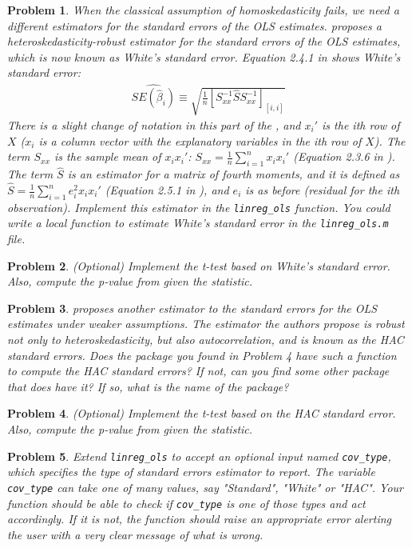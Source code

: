 \documentclass[12pt, a4paper]{article}
\newtheorem{problem}{Problem}
\begin{document}
\begin{problem}
When the classical assumption of homoskedasticity fails, we need a different estimators for the standard errors of the OLS estimates.
\citet{W1980} proposes a heteroskedasticity-robust estimator for the standard errors of the OLS estimates, which is now known as White's standard error.
Equation 2.4.1 in \citet{H2000} shows White's standard error:
\begin{align*}
\widehat{SE(\hat{\beta}_i)}\equiv\sqrt{\frac{1}{n}[S_{xx}^{-1}\hat{S}S_{xx}^{-1}]_{[i,i]}}
\end{align*}
There is a slight change of notation in this part of the \citet{H2000}, and \(x_i'\) is the ith row of \(X\) (\(x_i\) is a column vector with the explanatory variables in the ith row of \(X\)).
The term \(S_{xx}\) is the sample mean of \(x_ix_i'\): \(S_{xx}=\frac{1}{n}\sum_{i=1}^nx_ix_i'\) (Equation 2.3.6 in \citet{H2000}).
The term \(\hat{S}\) is an estimator for a matrix of fourth moments, and it is defined as \(\hat{S}=\frac{1}{n}\sum_{i=1}^ne_i^2x_ix_i'\) (Equation 2.5.1 in \citet{H2000}), and \(e_i\) is as before (residual for the ith observation).
Implement this estimator in the \texttt{linreg\_ols} function.
You could write a local function to estimate White's standard error in the \texttt{linreg\_ols.m} file.
\end{problem}
\begin{problem}
(Optional) Implement the t-test based on White's standard error. Also, compute the p-value from given the statistic.
\end{problem}
\begin{problem}
\citet{NW1987} proposes another estimator to the standard errors for the OLS estimates under weaker assumptions.
The estimator the authors propose is robust not only to heteroskedasticity, but also autocorrelation, and is known as the HAC standard errors.
Does the package you found in Problem 4 have such a function to compute the HAC standard errors?
If not, can you find some other package that does have it?
If so, what is the name of the package?
\end{problem}
\begin{problem}
(Optional) Implement the t-test based on the HAC standard error. Also, compute the p-value from given the statistic.
\end{problem}
\begin{problem}
Extend \texttt{linreg\_ols} to accept an optional input named \texttt{cov\_type}, which specifies the type of standard errors estimator to report.
The variable \texttt{cov\_type} can take one of many values, say "Standard", "White" or "HAC".
Your function should be able to check if \texttt{cov\_type} is one of those types and act accordingly.
If it is not, the function should raise an appropriate error alerting the user with a very clear message of what is wrong.
\end{problem}
\newpage
\printbibliography
\newpage
\end{document}
